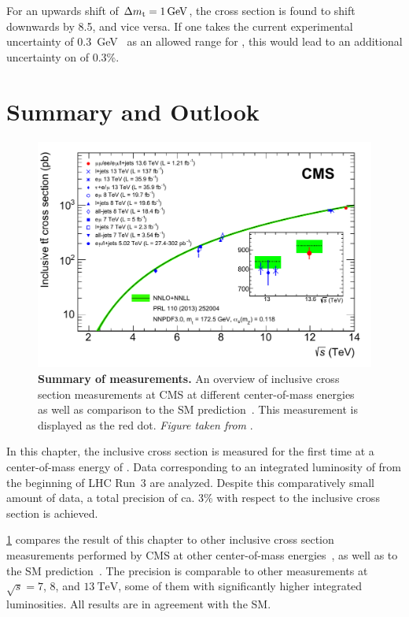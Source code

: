 For an upwards shift of $\Delta \mt = \SI{1}{\GeV}$, the \ttbar cross section is found to shift downwards by \SI{8.5}{\pb}, and vice versa. If one takes the current experimental uncertainty of \SI{0.3}{\GeV}~\cite{PDG:2022pth} as an allowed range for \mt, this would lead to an additional uncertainty on \sigmatt of 0.3\%.

\section{Summary and Outlook}
\label{sec:ttxs:summary}

\begin{figure}[!ht]
    \centering
    \includegraphics[width=0.8\linewidth]{figures/ttxs/tt_curve.pdf}
    \caption{\textbf{Summary of \sigmatt measurements.} An overview of inclusive \ttbar cross section measurements at CMS at different center-of-mass energies~\cite{CMS:TOP-11-007, CMS:TOP-14-018, CMS:TOP-12-006, CMS:TOP-13-004, CMS:TOP-17-001, CMS:TOP-18-005, CMS:TOP-20-001, CMS:TOP-20-004} as well as comparison to the SM prediction~\cite{Czakon:2013goa}. This measurement is displayed as the red dot. \textit{Figure taken from }.}
    \label{fig:ttxs:ttcurve}
\end{figure}

In this chapter, the inclusive \ttbar cross section is measured for the first time at a center-of-mass energy of \sqrtsRIII. Data corresponding to an integrated luminosity of \lumiRIII from the beginning of LHC Run~3 are analyzed. Despite this comparatively small amount of data, a total precision of ca. 3\% with respect to the inclusive cross section is achieved.

\cref{fig:ttxs:ttcurve} compares the result of this chapter to other inclusive \ttbar cross section measurements performed by CMS at other center-of-mass energies~\cite{CMS:TOP-11-007, CMS:TOP-14-018, CMS:TOP-12-006, CMS:TOP-13-004, CMS:TOP-17-001, CMS:TOP-18-005, CMS:TOP-20-001, CMS:TOP-20-004}, as well as to the SM prediction~\cite{Czakon:2013goa}. The precision is comparable to other measurements at $\sqrt{s} = 7$, $8$, and $\SI{13}{\TeV}$, some of them with significantly higher integrated luminosities. All results are in agreement with the SM.

